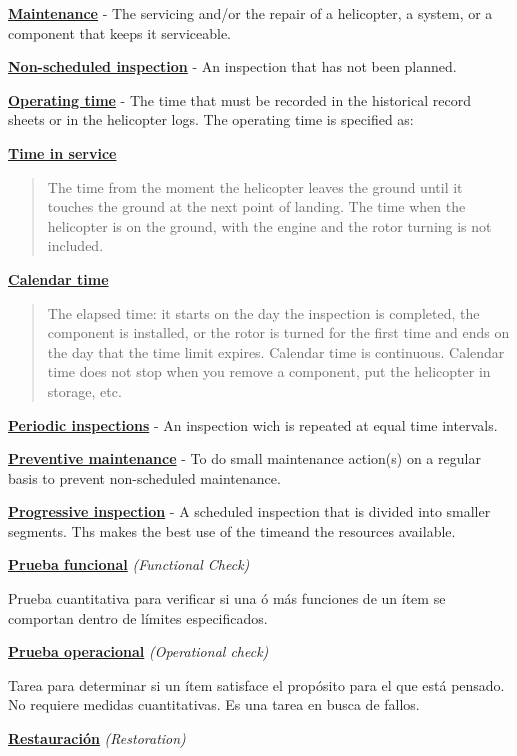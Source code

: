 \documentclass[
]{article}
\begin{document}
\textbf{\ul{Maintenance}} - The servicing and/or the repair of a
helicopter, a system, or a component that keeps it serviceable.

\textbf{\ul{Non-scheduled inspection}} - An inspection that has not been
planned.

\textbf{\ul{Operating time}} - The time that must be recorded in the
historical record sheets or in the helicopter logs. The operating time
is specified as:

\newpage

\textbf{\ul{Time in service}}

\begin{quote}
The time from the moment the helicopter leaves the ground until it
touches the ground at the next point of landing. The time when the
helicopter is on the ground, with the engine and the rotor turning is
not included.
\end{quote}

\textbf{\ul{Calendar time}}

\begin{quote}
The elapsed time: it starts on the day the inspection is completed, the
component is installed, or the rotor is turned for the first time and
ends on the day that the time limit expires. Calendar time is
continuous. Calendar time does not stop when you remove a component, put
the helicopter in storage, etc.
\end{quote}

\textbf{\ul{Periodic inspections}} - An inspection wich is repeated at
equal time intervals.

\textbf{\ul{Preventive maintenance}} - To do small maintenance action(s)
on a regular basis to prevent non-scheduled maintenance.

\textbf{\ul{Progressive inspection}} - A scheduled inspection that is
divided into smaller segments. Ths makes the best use of the timeand the
resources available.

\textbf{\ul{Prueba funcional}} \emph{(Functional Check)}

Prueba cuantitativa para verificar si una ó más funciones de un ítem se
comportan dentro de límites especificados.

\textbf{\ul{Prueba operacional}} \emph{(Operational check)}

Tarea para determinar si un ítem satisface el propósito para el que está
pensado. No requiere medidas cuantitativas. Es una tarea en busca de
fallos.

\textbf{\ul{Restauración}} \emph{(Restoration)}
\end{document}
